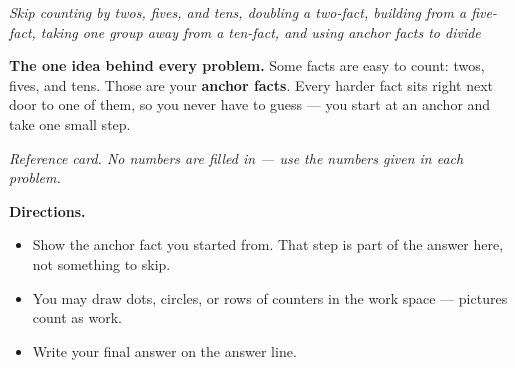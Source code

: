 \documentclass[12pt]{article}
\begin{document}

\begin{center}
\textit{Skip counting by twos, fives, and tens, doubling a two-fact, building
from a five-fact, taking one group away from a ten-fact, and using anchor facts
to divide}
\end{center}

\noindent\textbf{The one idea behind every problem.} Some facts are easy to
count: twos, fives, and tens. Those are your \textbf{anchor facts}. Every harder
fact sits right next door to one of them, so you never have to guess --- you
start at an anchor and take one small step.

\begin{center}

\smallskip
\small\textit{Reference card. No numbers are filled in --- use the numbers given
in each problem.}\normalsize
\end{center}

\noindent\textbf{Directions.}
\begin{itemize}[leftmargin=1.2cm, itemsep=2pt, topsep=2pt]
\item Show the anchor fact you started from. That step is part of the answer
here, not something to skip.
\item You may draw dots, circles, or rows of counters in the work space ---
pictures count as work.
\item Write your final answer on the answer line.
\end{itemize}

\end{document}
